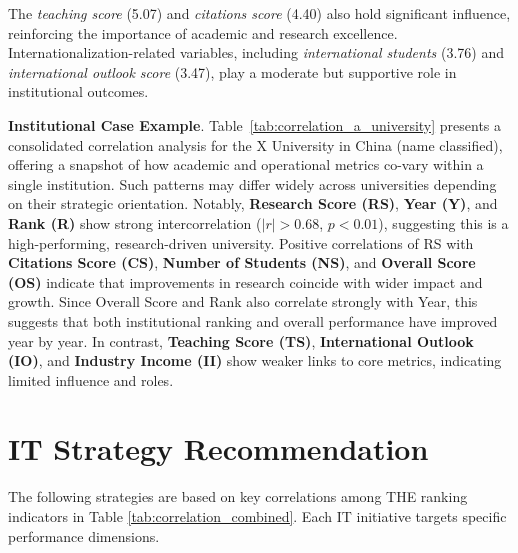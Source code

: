 \documentclass[conference]{IEEEtran}
\begin{document}
The \textit{teaching score} (5.07) and \textit{citations score} (4.40) also hold significant influence, reinforcing the importance of academic and research excellence. Internationalization-related variables, including \textit{international students} (3.76) and \textit{international outlook score} (3.47), play a moderate but supportive role in institutional outcomes.

\textbf{Institutional Case Example}. Table~\ref{tab:correlation_a_university} presents a consolidated correlation analysis for the X University in China (name classified), offering a snapshot of how academic and operational metrics co-vary within a single institution. Such patterns may differ widely across universities depending on their strategic orientation. Notably, \textbf{Research Score (RS)}, \textbf{Year (Y)}, and \textbf{Rank (R)} show strong intercorrelation ($|r| > 0.68$, $p < 0.01$), suggesting this is a high-performing, research-driven university. Positive correlations of RS with \textbf{Citations Score (CS)}, \textbf{Number of Students (NS)}, and \textbf{Overall Score (OS)} indicate that improvements in research coincide with wider impact and growth. Since Overall Score and Rank also correlate strongly with Year, this suggests that both institutional ranking and overall performance have improved year by year. In contrast, \textbf{Teaching Score (TS)}, \textbf{International Outlook (IO)}, and \textbf{Industry Income (II)} show weaker links to core metrics, indicating limited influence and roles.






\section{IT Strategy Recommendation}

The following strategies are based on key correlations among THE ranking indicators in Table \ref{tab:correlation_combined}. Each IT initiative targets specific performance dimensions.
\end{document}
